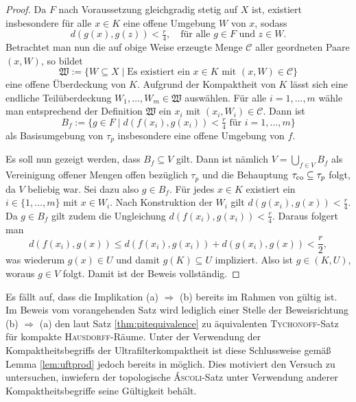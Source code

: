 \begin{proof}
  Da $F$ nach Voraussetzung gleichgradig stetig auf $X$ ist, existiert insbesondere für alle $x \in K$ eine offene Umgebung $W$ von $x$, sodass 
  \begin{displaymath}
    d(g(x),g(z)) < \tfrac{r}{4}, \quad \text{für alle $g \in F$ und $z \in W$}.
  \end{displaymath}
  Betrachtet man nun die auf obige Weise erzeugte Menge $\mathcal{C}$ aller geordneten Paare $(x,W)$, so bildet
  \begin{displaymath}
    \mathfrak{W} := \{W \subseteq X \mid \text{Es existiert ein $x \in K$ mit $(x,W) \in \mathcal{C}$} \}
  \end{displaymath}
  eine offene Überdeckung von $K$.
  Aufgrund der Kompaktheit von $K$ lässt sich eine endliche Teilüberdeckung $W_1,\dots,W_m \in \mathfrak{W}$ auswählen.
  Für alle $i = 1,\dots,m$ wähle man entsprechend der Definition $\mathfrak{W}$ ein $x_i$ mit $(x_i,W_i) \in \mathcal{C}$.
  Dann ist
  \begin{displaymath}
    B_f := \{ g \in F \mid d(f(x_i),g(x_i)) < \tfrac{r}{4} \text{ für } i = 1,\dots,m\}
  \end{displaymath}
  als Basisumgebung von $\tau_p$ insbesondere eine offene Umgebung von $f$.

  Es soll nun gezeigt werden, dass $B_f \subseteq V$ gilt.
  Dann ist nämlich $V = \bigcup_{f \in V} B_f$ als Vereinigung offener Mengen offen bezüglich $\tau_p$ und die Behauptung $\tau_{\mathrm{co}} \subseteq \tau_p$ folgt, da $V$ beliebig war.
  Sei dazu also $g \in B_f$.
  Für jedes $x \in K$ existiert ein $i \in \{1,\dots,m\}$ mit $x \in W_i$.
  Nach Konstruktion der $W_i$ gilt $d(g(x_i),g(x)) < \tfrac{r}{4}$.
  Da $g \in B_f$ gilt zudem die Ungleichung $d(f(x_i),g(x_i)) < \tfrac{r}{4}$.
  Daraus folgert man
  \begin{displaymath}
    d(f(x_i),g(x)) \leq d(f(x_i),g(x_i)) + d(g(x_i),g(x)) < \frac{r}{2},
  \end{displaymath}
  was wiederum $g(x) \in U$ und damit $g(K) \subseteq U$ impliziert. 
  Also ist $g \in (K,U)$, woraus $g \in V$ folgt.
  Damit ist der Beweis vollständig.
\end{proof}

Es fällt auf, dass die Implikation (a) $\Rightarrow$ (b) bereits im Rahmen von \ZF gültig ist.
Im Beweis vom vorangehenden Satz wird lediglich einer Stelle der Beweisrichtung (b) $\Rightarrow$ (a) den laut Satz \ref{thm:pitequivalence} zu \PIT äquivalenten \textsc{Tychonoff}-Satz für kompakte \textsc{Hausdorff}-Räume.
Unter der Verwendung der Kompaktheitsbegriffs der Ultrafilterkompaktheit ist diese Schlussweise gemäß Lemma \ref{lem:uftprod} jedoch bereits in \ZF möglich.  
Dies motiviert den Versuch zu untersuchen, inwiefern der topologische \textsc{Áscoli}-Satz unter Verwendung anderer Kompaktheitsbegriffe seine Gültigkeit behält.

